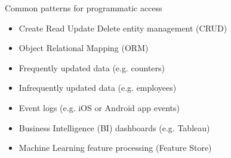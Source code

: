 \documentclass[t,pdf]{beamer}
\begin{document}
\begin{frame}{Common patterns for programmatic access}
\begin{itemize}
    \item Create Read Update Delete entity management (CRUD)
    \item Object Relational Mapping (ORM)
    \item Frequently updated data (e.g. counters)
    \item Infrequently updated data (e.g. employees)
    \item Event logs (e.g. iOS or Android app events) 
    \item Business Intelligence (BI) dashboards (e.g. Tableau)
    \item Machine Learning feature processing (Feature Store)
\end{itemize}
\end{frame}
\end{document}
